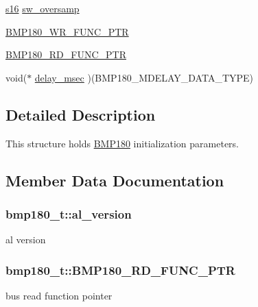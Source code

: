 \begin{DoxyCompactItemize}
\item 
\hyperlink{bmp180_8h_a4cb19f4a3324cfe0938ddfbfabaa825b}{s16} \hyperlink{structbmp180__t_a0bda5ec8f08249ee69f2e4a14df59f6e}{sw\+\_\+oversamp}
\item 
\hyperlink{structbmp180__t_a423adc61f46263a61285f13c1bb49375}{B\+M\+P180\+\_\+\+W\+R\+\_\+\+F\+U\+N\+C\+\_\+\+P\+TR}
\item 
\hyperlink{structbmp180__t_aaef0848adf7837c8cc64024a70cc683f}{B\+M\+P180\+\_\+\+R\+D\+\_\+\+F\+U\+N\+C\+\_\+\+P\+TR}
\item 
void($\ast$ \hyperlink{structbmp180__t_ad6875c8bcf81da576a90decbdf0f2a93}{delay\+\_\+msec} )(B\+M\+P180\+\_\+\+M\+D\+E\+L\+A\+Y\+\_\+\+D\+A\+T\+A\+\_\+\+T\+Y\+PE)
\end{DoxyCompactItemize}


\subsection{Detailed Description}
This structure holds \hyperlink{classBMP180}{B\+M\+P180} initialization parameters. 

\subsection{Member Data Documentation}
\subsubsection[{\texorpdfstring{al\+\_\+version}{al_version}}]{ bmp180\+\_\+t\+::al\+\_\+version}\hypertarget{structbmp180__t_aef41548b2ff2ff3cc7db7984cace6918}{}\label{structbmp180__t_aef41548b2ff2ff3cc7db7984cace6918}
al version 
\subsubsection[{\texorpdfstring{B\+M\+P180\+\_\+\+R\+D\+\_\+\+F\+U\+N\+C\+\_\+\+P\+TR}{BMP180_RD_FUNC_PTR}}]{\setlength{\rightskip}{0pt plus 5cm}bmp180\+\_\+t\+::\+B\+M\+P180\+\_\+\+R\+D\+\_\+\+F\+U\+N\+C\+\_\+\+P\+TR}\hypertarget{structbmp180__t_aaef0848adf7837c8cc64024a70cc683f}{}\label{structbmp180__t_aaef0848adf7837c8cc64024a70cc683f}
bus read function pointer 
